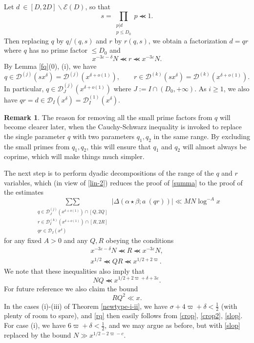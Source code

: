 \documentclass[12pt,a4paper,reqno]{amsart}
\numberwithin{equation}{section}
\theoremstyle{plain}
\theoremstyle{definition}
\newtheorem{remark}[theorem]{Remark}
\newcommand\eps{\varepsilon}
\newcommand\Dcal[2]{\mathcal{D}^{({#1})}({#2})}
\newcommand{\DI}[3]{\mathcal{D}_{{#1}}^{({#2})}({#3})}
\newcommand{\DIone}[2]{\mathcal{D}_{{#1}}({#2})}
\newcommand\sumsum{\mathop{\sum\sum}\limits}
\renewcommand{\lessapprox}{\llcurly}
\begin{document}
Let $d\ \in [D,2D] \backslash \mathcal{E}(D)$, so that
$$
s=\prod_{\substack{p|d\\ p\leq D_0}} p \lessapprox 1.
$$
Then replacing $q$ by $q/(q,s)$ and $r$ by $r(q,s)$, we obtain a
factorization $d=qr$ where $q$ has no prime factor $\leq D_0$ and
\begin{equation}\label{los}
  x^{-3\eps-\delta} N \lessapprox r \lessapprox x^{-3\eps} N.
\end{equation}
By Lemma \ref{fq}(0), (i), we have
$$
q\in \Dcal{j}{sx^{\delta}}=\Dcal{j}{x^{\delta+o(1)}},\quad\quad
r\in \Dcal{k}{sx^{\delta}}=\Dcal{k}{x^{\delta+o(1)}}.
$$
In particular, $q \in \DI{J}{j}{x^{\delta+o(1)}}$ where $J := I \cap
(D_0,+\infty)$.  As $i \geq 1$, we also have $qr = d \in
\DIone{I}{x^\delta}=\DI{I}{1}{x^{\delta}}$.

\begin{remark}
  The reason for removing all the small prime factors from $q$ will
  become clearer later, when the Cauchy-Schwarz inequality is invoked
  to replace the single parameter $q$ with two parameters $q_1,q_2$ in
  the same range. By excluding the small primes from $q_1,q_2$, this
  will ensure that $q_1$ and $q_2$ will almost always be coprime,
  which will make things much simpler.
\end{remark}

The next step is to perform dyadic decompositions of the range of the
$q$ and $r$ variables, which (in view of \eqref{lin-2}) reduces the
proof of \eqref{summa} to the proof of the estimates
$$
\sumsum_{\substack{q \in \DI{J}{j}{x^{\delta+o(1)}}\cap
    [Q,2Q]\\
    r \in \DI{I}{k}{x^{\delta+o(1)}} \cap [R,2R]\\
    qr \in \DIone{I}{x^\delta}} } |\Delta(\alpha \star \beta; a\
(qr))| \ll MN \log^{-A} x
$$
for any fixed $A>0$ and any $Q,R$ obeying the conditions
\begin{gather}
  x^{-3\eps-\delta} N \lessapprox R \lessapprox x^{-3\eps} N,
\label{crop}
\\
x^{1/2} \lessapprox QR \lessapprox x^{1/2+2\varpi}.  \label{crop2}
\end{gather}
We note that these inequalities also imply that
\begin{equation}\label{eq-nr}
  NQ\lessapprox x^{1/2+2\varpi+\delta+3\eps}.
\end{equation}
For future reference we also claim the bound
\begin{equation}\label{rq}
RQ^2 \ll x.
\end{equation}
In the cases (i)-(iii) of Theorem \ref{newtype-i-ii}, we have $\sigma+4\varpi+\delta < \frac{1}{2}$ (with plenty of room to spare), and \eqref{rq} then easily follows from \eqref{crop}, \eqref{crop2}, \eqref{slop}.  For case (i), we have $6\varpi+\delta < \frac{1}{2}$, and we may argue as before, but with \eqref{slop} replaced by the bound $N \gg  x^{1/2-2\varpi-c}$.
\end{document}
